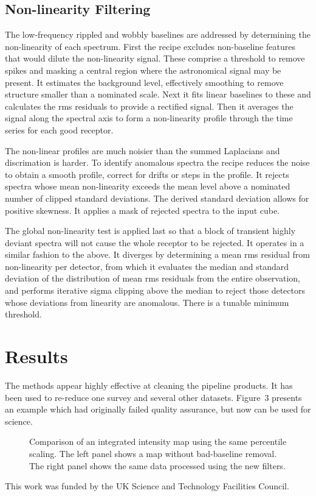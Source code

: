 \subsection{Non-linearity Filtering}

The low-frequency rippled and wobbly baselines are addressed by 
determining the non-linearity of each spectrum.  First the recipe
excludes non-baseline features that would dilute the non-linearity
signal.  These comprise a threshold to remove spikes and masking a
central region where the astronomical signal may be present. It
estimates the background level, effectively smoothing to remove
structure smaller than a nominated scale.  Next it fits linear
baselines to these and calculates the rms residuals to provide a
rectified signal.  Then it averages the signal along the spectral axis
to form a non-linearity profile through the time series for each
good receptor.

The non-linear profiles are much noisier than the summed Laplacians
and discrimation is harder.  To identify anomalous spectra the recipe
reduces the noise to obtain a smooth profile, correct for drifts or
steps in the profile.  It rejects spectra whose mean non-linearity
exceeds the mean level above a nominated number of clipped standard
deviations.  The derived standard deviation allows for positive
skewness.  It applies a mask of rejected spectra to the input cube.

The global non-linearity test is applied last so that a block of transient 
highly deviant spectra will not cause the whole receptor to be rejected.  It 
operates in a similar fashion to the above.  It diverges by determining a 
mean rms residual from non-linearity per detector, from which it evaluates 
the median and standard deviation of the distribution of mean rms 
residuals from the entire observation, and performs iterative sigma 
clipping above the median to reject those detectors whose deviations from 
linearity are anomalous.  There is a tunable minimum threshold.

\section{Results}

The methods appear highly effective at cleaning the pipeline products.
It has been used to re-reduce one survey and several other datasets.
Figure~3 presents an example which had originally failed quality assurance,
but now can be used for science.  


\begin{figure}[!ht]
\caption{Comparison of an integrated intensity map using the same
percentile scaling.  The left panel shows a map without bad-baseline
removal.  The right panel shows the same data processed using the
new filters.}
\end{figure}

\acknowledgements This work was funded by the UK Science and Technology Facilities Council.


